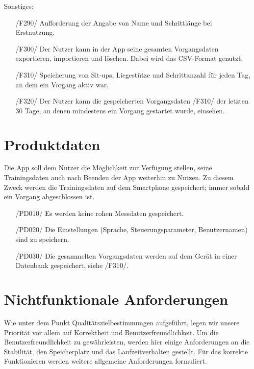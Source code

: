 \documentclass[a4paper,12pt]{article}
\begin{document}
		\textsf{Sonstiges:}
	\begin{itemize}
        \item[/F290/] Aufforderung der Angabe von Name und Schrittlänge bei Erstnutzung.
        \item[/F300/] Der Nutzer kann in der App seine gesamten \Gls{Vorgangsdaten} exportieren, importieren und löschen. Dabei wird das CSV-Format genutzt. 
        \item[/F310/] Speicherung von Sit-ups, Liegestütze und Schrittanzahl für jeden Tag, an dem ein \Gls{Vorgang} aktiv war.
        \item[/F320/] Der Nutzer kann die gespeicherten Vorgangsdaten /F310/ der letzten 30 Tage, an denen mindestens ein Vorgang gestartet wurde, einsehen. 
  
  
      \end{itemize}
\vspace{1cm}
\section{Produktdaten}
Die App soll dem Nutzer die Möglichkeit zur Verfügung stellen, seine Trainingsdaten auch nach Beenden der App weiterhin zu Nutzen. Zu diesem Zweck werden die Trainingsdaten auf dem Smartphone gespeichert; immer sobald ein Vorgang abgeschlossen ist.
\begin{itemize}
	\item[/PD010/] Es werden keine rohen Messdaten gespeichert.
	\item[/PD020/] Die Einstellungen (Sprache, \Gls{Steuerungsparameter}, Benutzernamen) sind zu speichern. 
	\item[/PD030/] Die gesammelten \Gls{Vorgangsdaten} werden auf dem Gerät in einer Datenbank gespeichert, siehe /F310/.
\end{itemize}

\vspace{1cm}
\section{Nichtfunktionale Anforderungen}
Wie unter dem Punkt Qualitätszielbestimmungen aufgeführt, legen wir unsere Priorität vor allem auf Korrektheit und Benutzerfreundlichkeit. Um die Benutzerfreundlichkeit zu gewährleisten, werden hier einige Anforderungen an die Stabilität, den Speicherplatz und das Laufzeitverhalten gestellt. Für das korrekte Funktionieren werden weitere allgemeine Anforderungen formuliert.
\end{document}
